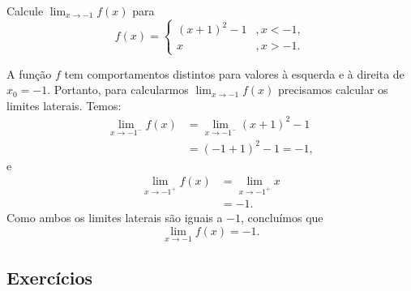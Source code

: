 \begin{exeresol}
  Calcule $\lim_{x\to -1} f(x)$ para
  \begin{equation}
    f(x) = \left\{
      \begin{array}{ll}
        (x+1)^2-1 &, x<-1,\\
        x &, x>-1.
      \end{array}
\right.
  \end{equation}
\end{exeresol}
\begin{resol}
  A função $f$ tem comportamentos distintos para valores à esquerda e à direita de $x_0=-1$. Portanto, para calcularmos $\lim_{x\to -1} f(x)$ precisamos calcular os limites laterais. Temos:
  \begin{align}
    \lim_{x\to -1^-} f(x) &= \lim_{x\to -1^-} (x+1)^2-1\\
                          &= (-1+1)^2-1 = -1,
  \end{align}
  e
  \begin{align}
    \lim_{x\to -1^+} f(x) &= \lim_{x\to -1^+} x\\
                          &= -1.
  \end{align}
  Como ambos os limites laterais são iguais a $-1$, concluímos que
  \begin{equation}
    \lim_{x\to -1} f(x) = -1.
  \end{equation}
\end{resol}

\subsection*{Exercícios}

